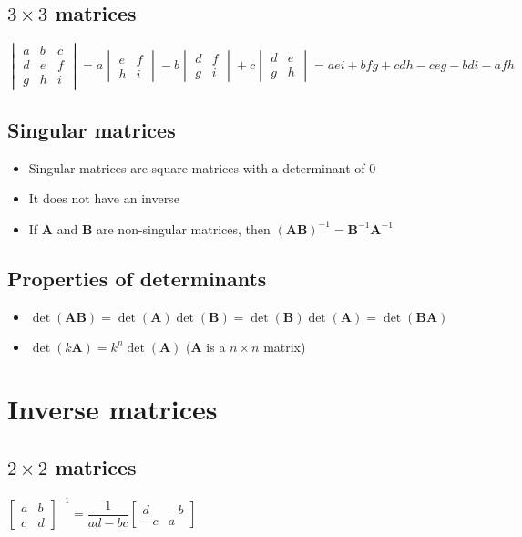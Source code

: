 \subsection{$3\times3$ matrices}

$\begin{vmatrix}a&b&c\\d&e&f\\g&h&i\end{vmatrix}=a\begin{vmatrix}e&f\\h&i\end{vmatrix}-b\begin{vmatrix}d&f\\g&i\end{vmatrix}+c\begin{vmatrix}d&e\\g&h\end{vmatrix}=aei+bfg+cdh-ceg-bdi-afh$

\subsection{Singular matrices}
\begin{itemize}
    \item Singular matrices are square matrices with a determinant of 0
    \item It does not have an inverse
    \item If $\mathbf{A}$ and $\mathbf{B}$ are non-singular matrices, then $(\mathbf{AB})^{-1}=\mathbf{B}^{-1}\mathbf{A}^{-1}$
\end{itemize}



\subsection{Properties of determinants}
\begin{itemize}
    \item $\det(\mathbf{AB})=\det(\mathbf{A})\det(\mathbf{B})=\det(\mathbf{B})\det(\mathbf{A})=\det(\mathbf{BA})$
    \item $\det(k\mathbf{A})=k^n\det(\mathbf{A})$ ($\mathbf{A}$ is a $n\times n$ matrix)
\end{itemize}


\section{Inverse matrices}
\subsection{$2\times2$ matrices}
$\begin{bmatrix}
        a & b \\c & d
    \end{bmatrix}^{-1}=\dfrac{1}{ad-bc}\begin{bmatrix}
        d & -b \\-c & a
    \end{bmatrix}$

